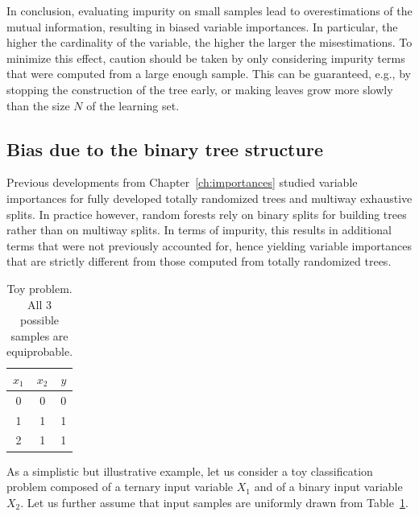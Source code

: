 In conclusion, evaluating impurity on small samples lead to overestimations
of the mutual information, resulting in biased variable importances.
In particular, the higher the cardinality of the variable, the higher
the larger the misestimations. To minimize this effect, caution should be
taken by only considering impurity terms that were computed from a large
enough sample. This can be guaranteed, e.g., by stopping the construction
of the tree early, or making leaves grow more slowly than the size $N$ of the
learning set.

\subsection{Bias due to the binary tree structure}
\label{sec:bias:tree}

Previous developments from Chapter~\ref{ch:importances} studied variable
importances for fully developed totally randomized trees and multiway
exhaustive splits. In practice however, random forests rely on binary
splits for building trees rather than on multiway splits. In terms of impurity,
this results in additional terms that were not previously accounted for, hence
yielding variable importances that are strictly different from those computed
from totally randomized trees.

\begin{table}
    \centering
    \begin{tabular}{| c c | c |}
    \hline
    $x_1$ & $x_2$ & $y$ \\
    \hline
    \hline
    0 & 0 & 0 \\
    1 & 1 & 1 \\
    2 & 1 & 1 \\
    \hline
    \end{tabular}
    \caption{Toy problem. All $3$ possible samples are equiprobable.}
    \label{table:simulation:bias:tree}
\end{table}

As a simplistic but illustrative example, let us consider a toy classification problem
composed of a ternary input variable $X_1$ and of a binary input variable
$X_2$. Let us further assume that input samples are uniformly drawn from
Table~\ref{table:simulation:bias:tree}.

